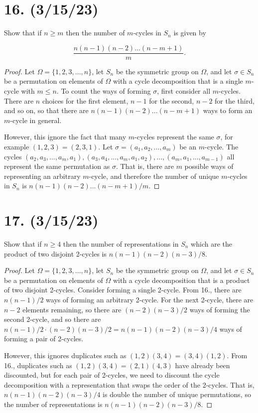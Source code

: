 \documentclass{article}
\begin{document}
\section*{16. (3/15/23)}

Show that if $n \geq m$ then the number of $m$-cycles in $S_n$ is given by

\begin{equation*}
    \frac{n(n - 1)(n - 2)...(n - m + 1)}{m}.
\end{equation*}
    
\begin{proof}
    Let $\Omega = \{1, 2, 3, ..., n\}$, let $S_n$ be the symmetric group on $\Omega$, and let $\sigma \in S_n$ be a permutation on elements of $\Omega$ with a cycle decomposition that is a single $m$-cycle with $m \leq n$. To count the ways of forming $\sigma$, first consider all $m$-cycles. There are $n$ choices for the first element, $n - 1$ for the second, $n - 2$ for the third, and so on, so that there are $n(n - 1)(n - 2)...(n - m + 1)$ ways to form an $m$-cycle in general.

    However, this ignore the fact that many $m$-cycles represent the same $\sigma$, for example $(1, 2, 3) = (2, 3, 1)$. Let $\sigma = (a_1, a_2, ..., a_m)$ be an $m$-cycle. The cycles $(a_2, a_3, ..., a_m, a_1), (a_3, a_4, ..., a_m, a_1, a_2), ..., (a_m, a_1, ..., a_{m - 1})$ all represent the same permutation as $\sigma$. That is, there are $m$ possible ways of representing an arbitrary $m$-cycle, and therefore the number of unique $m$-cycles in $S_n$ is $n(n - 1)(n - 2)...(n - m + 1)/m$.
\end{proof}

\section*{17. (3/15/23)}

Show that if $n \geq 4$ then the number of representations in $S_n$ which are the product of two disjoint 2-cycles is $n(n - 1)(n - 2)(n - 3)/8$.

\begin{proof}
    Let $\Omega = \{1, 2, 3, ..., n\}$, let $S_n$ be the symmetric group on $\Omega$, and let $\sigma \in S_n$ be a permutation on elements of $\Omega$ with a cycle decomposition that is a product of two disjoint 2-cycles. Consider forming a single 2-cycle. From 16., there are $n(n - 1)/2$ ways of forming an arbitrary 2-cycle. For the next 2-cycle, there are $n - 2$ elements remaining, so there are $(n - 2)(n - 3)/2$ ways of forming the second 2-cycle, and so there are $n(n - 1) / 2 \cdot (n - 2)(n - 3) / 2 = n(n - 1)(n - 2)(n - 3) / 4$ ways of forming a pair of 2-cycles.

    However, this ignores duplicates such as $(1, 2)(3, 4) = (3, 4)(1, 2)$. From 16., duplicates such as $(1, 2)(3, 4) = (2, 1)(4, 3)$ have already been discounted, but for each pair of 2-cycles, we need to discount the cycle decomposition with a representation that swaps the order of the 2-cycles. That is, $n(n - 1)(n - 2)(n - 3) / 4$ is double the number of unique permutations, so the number of representations is $n(n - 1)(n - 2)(n - 3) / 8$.
\end{proof}
\end{document}

